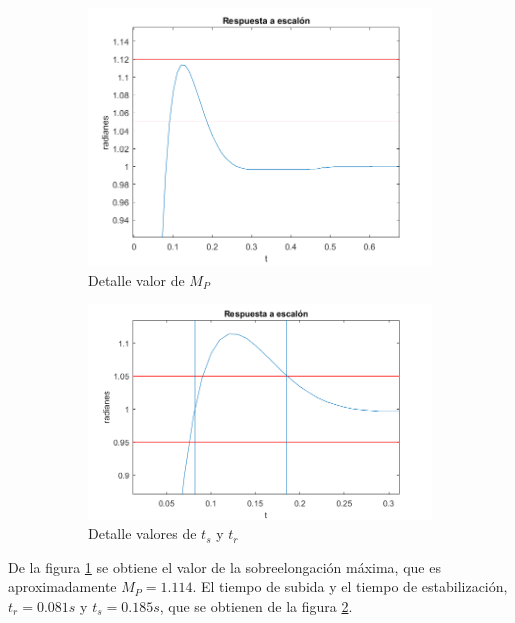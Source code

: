 \documentclass[a4paper]{article}
\begin{document}
\begin{center}
	\begin{figure}[htp]
		\begin{subfigure}{1\textwidth}
			\centering
			\includegraphics[width=12cm]{escalon_Mp2}
			\caption{Detalle valor de $M_P$}
			\label{Mp}
		\end{subfigure}
		
		\begin{subfigure}{1\textwidth}
			\centering
			\includegraphics[width=12cm]{escalon_ts_tr2}
			\caption{Detalle valores de $t_s$ y $t_r$}
			\label{fig:tr2}
		\end{subfigure}
		\caption{}
		\label{fig:detalle}
	\end{figure}
\end{center}

De la figura \ref{Mp} se obtiene el valor de la sobreelongación máxima, que es aproximadamente $M_P=1.114$. El tiempo de subida y el tiempo de estabilización, $t_r=0.081 s$ y $t_s=0.185 s$, que se obtienen de la figura \ref{fig:tr2}.
\end{document}
